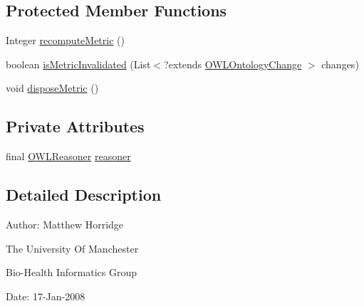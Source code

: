 \subsection*{Protected Member Functions}
\begin{DoxyCompactItemize}
\item 
Integer \hyperlink{classorg_1_1semanticweb_1_1owlapi_1_1metrics_1_1_unsatisfiable_class_count_metric_a66f7b73ada88c6420dcd8d7e1e3e2b98}{recompute\-Metric} ()
\item 
boolean \hyperlink{classorg_1_1semanticweb_1_1owlapi_1_1metrics_1_1_unsatisfiable_class_count_metric_a890efe39f467fe5500c3865d642b0897}{is\-Metric\-Invalidated} (List$<$?extends \hyperlink{classorg_1_1semanticweb_1_1owlapi_1_1model_1_1_o_w_l_ontology_change}{O\-W\-L\-Ontology\-Change} $>$ changes)
\item 
void \hyperlink{classorg_1_1semanticweb_1_1owlapi_1_1metrics_1_1_unsatisfiable_class_count_metric_a22d819668b3bf4ce0b6ace80d9747645}{dispose\-Metric} ()
\end{DoxyCompactItemize}
\subsection*{Private Attributes}
\begin{DoxyCompactItemize}
\item 
final \hyperlink{interfaceorg_1_1semanticweb_1_1owlapi_1_1reasoner_1_1_o_w_l_reasoner}{O\-W\-L\-Reasoner} \hyperlink{classorg_1_1semanticweb_1_1owlapi_1_1metrics_1_1_unsatisfiable_class_count_metric_a22b41c912834349275f2b2b66ee4b189}{reasoner}
\end{DoxyCompactItemize}


\subsection{Detailed Description}
Author\-: Matthew Horridge\par
 The University Of Manchester\par
 Bio-\/\-Health Informatics Group\par
 Date\-: 17-\/\-Jan-\/2008\par
 \par
 

